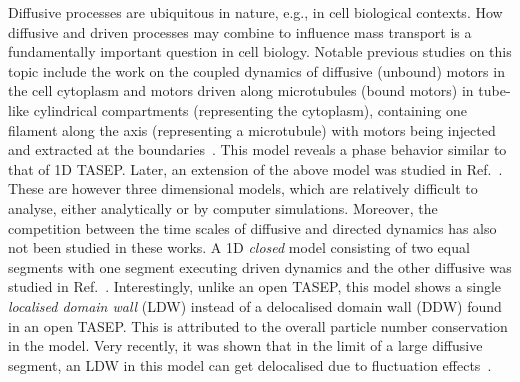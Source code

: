 \documentclass[aps,pre,twocolumn,superscriptaddress,amsmath,amssymb,longbibliography,floatfix]{revtex4}
\begin{document}
Diffusive processes are ubiquitous in nature, e.g., in cell biological contexts. How diffusive and driven processes may combine to influence mass transport is a fundamentally important question in cell biology. Notable previous studies on this topic include the work on the coupled dynamics of diffusive (unbound) motors
in the cell cytoplasm and motors driven along microtubules (bound motors) in tube-like cylindrical compartments (representing the
cytoplasm), containing one filament along the axis (representing a microtubule)
with motors being injected and extracted at the boundaries~\cite{lipowsky}.
This model
reveals a phase behavior similar to that of 1D TASEP. Later, an extension of the above
model was studied in Ref.~\cite{santen1}. These are however
three dimensional models, which are relatively difficult to analyse, either
analytically or by computer simulations. Moreover, the competition between the time scales of
diffusive and directed dynamics has also not been studied in these works. A 1D {\em closed} model consisting of two equal segments with one segment executing driven dynamics and the other diffusive was studied in Ref.~\cite{hinsch}. Interestingly, unlike an open TASEP, this model shows a single {\em localised domain wall} (LDW) instead of a delocalised domain wall (DDW) found in an open TASEP. This is attributed to the overall particle number conservation in the model. Very recently, it was shown that in the limit of a large diffusive segment, an LDW in this model can get delocalised due to fluctuation effects~\cite{parna}.
\end{document}
